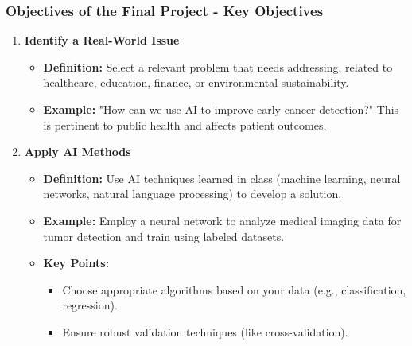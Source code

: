 \documentclass[aspectratio=169]{beamer}
\begin{document}
\begin{frame}[fragile]
    \frametitle{Objectives of the Final Project - Key Objectives}
    
    \begin{enumerate}
        \item \textbf{Identify a Real-World Issue}
            \begin{itemize}
                \item \textbf{Definition:} Select a relevant problem that needs addressing, related to healthcare, education, finance, or environmental sustainability.
                \item \textbf{Example:} "How can we use AI to improve early cancer detection?" This is pertinent to public health and affects patient outcomes.
            \end{itemize}
        
        \item \textbf{Apply AI Methods}
            \begin{itemize}
                \item \textbf{Definition:} Use AI techniques learned in class (machine learning, neural networks, natural language processing) to develop a solution.
                \item \textbf{Example:} Employ a neural network to analyze medical imaging data for tumor detection and train using labeled datasets.
                \item \textbf{Key Points:}
                    \begin{itemize}
                        \item Choose appropriate algorithms based on your data (e.g., classification, regression).
                        \item Ensure robust validation techniques (like cross-validation).
                    \end{itemize}
            \end{itemize}
    \end{enumerate}
\end{frame}
\end{document}
